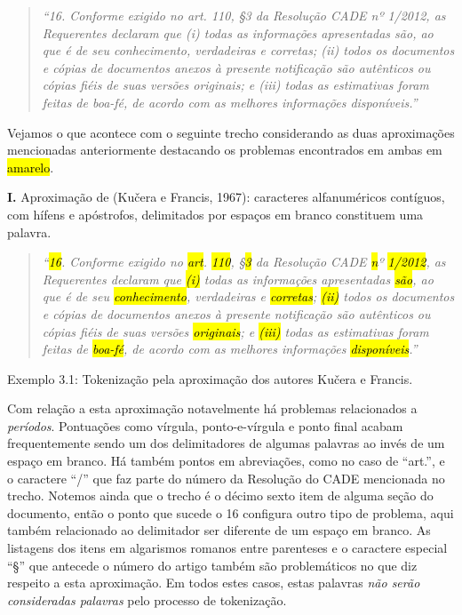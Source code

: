 \documentclass[11pt]{report}
\newcommand{\quotes}[1]{``#1''}
\begin{document}
\begin{quote}
  \textit{\quotes{16. Conforme exigido no art. 110, §3 da Resolução CADE nº 1/2012, as Requerentes declaram que (i) todas as informações apresentadas são, ao que é de seu
  conhecimento, verdadeiras e corretas; (ii) todos os documentos e cópias de documentos anexos à presente notificação são autênticos ou cópias fiéis de suas versões originais;
  e (iii) todas as estimativas foram feitas de boa-fé, de acordo com as melhores informações disponíveis.}}
\end{quote}

Vejamos o que acontece com o seguinte trecho considerando as duas aproximações mencionadas anteriormente destacando os problemas encontrados em ambas em \hl{amarelo}.

\textbf{I.} Aproximação de (Kučera e Francis, 1967): caracteres alfanuméricos contíguos, com hífens e apóstrofos, delimitados por espaços em branco constituem uma palavra.

\begin{quote}
  \textit{\quotes{\hl{16}. Conforme exigido no \hl{art}. \hl{110}, §\hl{\mbox{3}} da Resolução CADE \hl{n}º \hl{1/2012}, as Requerentes declaram que \hl{(i)} todas as informações apresentadas \hl{\mbox{são}}, ao que é de seu
  \hl{conhecimento}, verdadeiras e \hl{corretas}; \hl{(ii)} todos os documentos e cópias de documentos anexos à presente notificação são autênticos ou cópias fiéis de suas versões \hl{originais};
  e \hl{(iii)} todas as estimativas foram feitas de \hl{\mbox{boa-fé}}, de acordo com as melhores informações \hl{\mbox{disponíveis}}.}}
\end{quote}
\begin{center}
  Exemplo 3.1: Tokenização pela aproximação dos autores Kučera e Francis.
\end{center}


Com relação a esta aproximação notavelmente há problemas relacionados a \textit{períodos}. Pontuações como vírgula, ponto-e-vírgula e ponto final acabam frequentemente sendo um dos
delimitadores de algumas palavras ao invés de um espaço em branco. Há também pontos em abreviações, como no caso de \quotes{art.}, e o caractere \quotes{/} que faz parte do número da
Resolução do CADE mencionada no trecho. Notemos ainda que o trecho é o décimo sexto item de alguma seção do documento, então o ponto que sucede o 16 configura outro tipo de problema,
aqui também relacionado ao delimitador ser diferente de um espaço em branco. As listagens dos itens em algarismos romanos entre parenteses e o caractere especial \quotes{§} que antecede o número
do artigo também são problemáticos no que diz respeito a esta aproximação. Em todos estes casos, estas palavras \textit{não serão consideradas palavras} pelo processo de tokenização.\pagebreak
\end{document}
